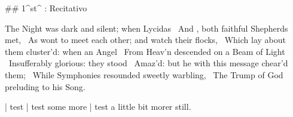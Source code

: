 \newpage
{}

## 1^st^ \mvmt: Recitativo

\beginnumbering
\pstart
The Night was dark and silent; when Lycidas  \
And , both faithful Shepherds met,  \
As wont to meet each other; and watch their flocks,  \
Which lay about them cluster’d: when an Angel  \
From Heav’n descended on a Beam of Light  \
Insufferably glorious: they stood  \
Amaz’d: but he with this message chear’d them;  \
While Symphonies resounded sweetly warbling,  \
The Trump of God preluding to his Song.
\pend
\endnumbering

| test
| test some more
| test a little bit morer still.

\vspace*{\stretch{1}}
